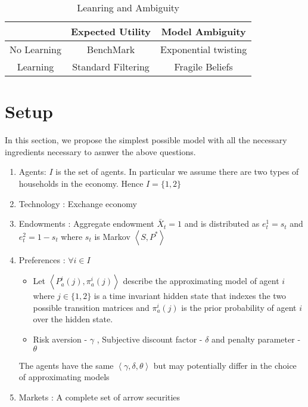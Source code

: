 \documentclass[a4paper,12pt]{article}
\begin{document}
\begin{table}
  \centering
  \begin{tabular}{|c||c|c|}
\hline
     & Expected Utility & Model Ambiguity \\ \hline \hline
No Learning & BenchMark & Exponential twisting \\ \hline
Learning & Standard Filtering & Fragile Beliefs \\ \hline
  \end{tabular}
  \caption{Leanring and Ambiguity}
  \label{tab:LearnAmb}
\end{table}
\section{Setup}
In this section, we propose the simplest possible model with all the necessary ingredients necessary to asnwer the above questions.

\begin{enumerate}
	\item Agents: $I$ is the  set of agents. In particular we assume there are two types of households in the economy. Hence $I= \{1,2\}$
	\item Technology : Exchange economy
	\item Endowments  : Aggregate endowment $\bar{X}_t = 1$ and is distributed as $e^1_t=s_t$ and $e^2_t=1-s_t$ where $s_t$ is Markov $\left\langle  S, P^{*} \right\rangle$ 
	\item Preferences : $\forall i \in I $
	
\begin{itemize}
	\item Let $\left\langle  P_a^i(j) , \pi_a^i (j) \right\rangle$ describe the approximating model of agent $i$ where $j \in \{1,2\}$ is a time invariant hidden state that indexes the two possible transition matrices and $ \pi_a^i (j)$ is the prior probability of agent $i$ over the hidden state.
	\item  Risk aversion  - $\gamma$ , Subjective discount factor - $\delta$ and penalty parameter - $\theta $
\end{itemize}
 \noindent The agents have the same $\left\langle \gamma, \delta, \theta \right\rangle$ but may potentially differ in the choice of approximating models 
 \item Markets  : A complete set of arrow securities
 \end{enumerate}
\end{document}
